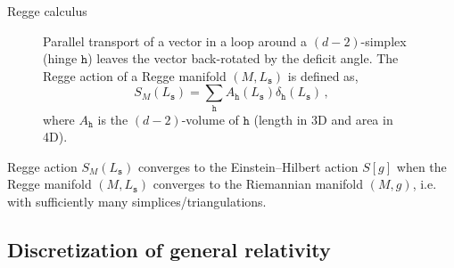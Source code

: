 \documentclass[12pt,titlepage]{article}
\begin{document}
\begin{frame}{Regge calculus}
\begin{list}{\,}{\leftmargin=1em \itemindent=0em}
\begin{figure}[!ht]
\begin{minipage}{0.3\linewidth}
            \end{minipage}
            \begin{minipage}{0.7\linewidth}
                Parallel transport of a vector in a loop around a $(d-2)$-simplex (hinge $\mathtt{h}$) leaves the vector back-rotated by the deficit angle. The Regge action of a Regge manifold $(M,L_\mathtt{s})$ is defined as,
                \begin{equation}
                    S_M(L_\mathtt{s})=\sum_\mathtt{h}A_\mathtt{h}(L_\mathtt{s})\delta_\mathtt{h}(L_\mathtt{s})\,,
                \end{equation}
                where $A_\mathtt{h}$ is the $(d-2)$-volume of $\mathtt{h}$ (length in 3D and area in 4D).
            \end{minipage}
        \end{figure}\FloatBarrier
        \item<3-> Regge action $S_M(L_\mathtt{s})$ converges to the Einstein–Hilbert action $S[g]$ when the Regge manifold $(M,L_\mathtt{s})$ converges to the Riemannian manifold $(M,g)$, i.e. with sufficiently many simplices/triangulations.
    \end{list}
\end{frame}

\subsection{Discretization of general relativity}
\end{document}
